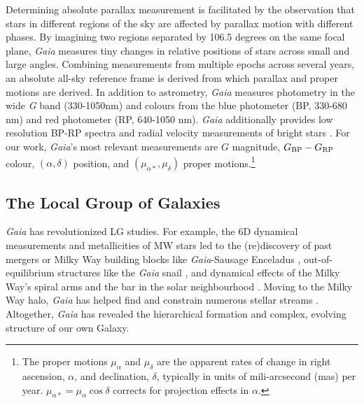 Determining absolute parallax measurement is facilitated by the
observation that stars in different regions of the sky are affected by
parallax motion with different phases. By imagining two regions
separated by 106.5 degrees on the same focal plane, \emph{Gaia} measures
tiny changes in relative positions of stars across small and large
angles. Combining measurements from multiple epochs across several
years, an absolute all-sky reference frame is derived from which
parallax and proper motions are derived. In addition to astrometry,
\emph{Gaia} measures photometry in the wide \emph{G} band (330-1050nm)
and colours from the blue photometer (BP, 330-680 nm) and red photometer
(RP, 640-1050 nm). \emph{Gaia} additionally provides low resolution
BP-RP spectra and radial velocity measurements of bright stars \citep[of
magnitudes \(G_{\rm RVS} < 16\),][]{gaiacollaboration+2016}. For our
work, \emph{Gaia}'s most relevant measurements are \(G\) magnitude,
\(G_{\rm BP} - G_{\rm RP}\) colour, \((\alpha, \delta)\) position, and
\((\mu_{\alpha*}, \mu_\delta)\) proper motions.\footnote{The proper
  motions \(\mu_\alpha\) and \(\mu_\delta\) are the apparent rates of
  change in right ascension, \(\alpha\), and declination, \(\delta\),
  typically in units of mili-arcsecond (mas) per year.
  \(\mu_{\alpha*} = \mu_\alpha \cos \delta\) corrects for projection
  effects in \(\alpha\).}

\subsection{The Local Group of
Galaxies}\label{the-local-group-of-galaxies}

\emph{Gaia} has revolutionized LG studies. For example, the 6D dynamical
measurements and metallicities of MW stars led to the (re)discovery of
past mergers or Milky Way building blocks like \emph{Gaia}-Sausage
Enceladus
\citetext{\citealp[e.g.,][]{helmi+2018}; \citealp{belokurov+2018}; \citealp[but
see also][]{meza+2005}}, out-of-equilibrium structures like the
\emph{Gaia} snail \citep[e.g.,][]{antoja+2018}, and dynamical effects of
the Milky Way's spiral arms and the bar in the solar neighbourhood
\citep[ and references therein]{hunt+vasiliev2025}. Moving to the Milky
Way halo, \emph{Gaia} has helped find and constrain numerous stellar
streams \citep{ibata+malhan+martin2019, bonaca+price-whelan2025}.
Altogether, \emph{Gaia} has revealed the hierarchical formation and
complex, evolving structure of our own Galaxy.

